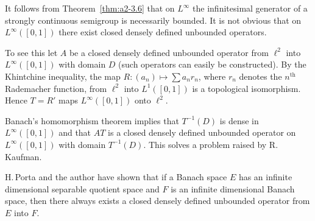 \begin{remark*}\label{rem:a2-final}
It follows from Theorem~\ref{thm:a2-3.6} that on $L^{\infty}$ the infinitesimal generator of a strongly continuous semigroup is necessarily bounded.
It is not obvious that on $L^{\infty}([0,1])$ there exist closed densely defined unbounded operators.

To see this let $A$ be a closed densely defined unbounded operator from $\ell^2$ into $L^{\infty}([0,1])$ with domain $D$ (such operators can easily be constructed).
By the Khintchine inequality, the map $R \colon (a_{n}) \mapsto \sum a_{n}r_{n}$, where $r_{n}$ denotes the $n^{\text{th}}$ Rademacher function, from $\ell^2$ into $L^1([0,1])$ is a topological isomorphism.
Hence $T = R'$ maps $L^{\infty}([0,1])$ onto $\ell^2$.

Banach's homomorphism theorem implies that $T^{-1}(D)$ is dense in $L^{\infty}([0,1])$ and that $AT$ is a closed densely defined unbounded operator on $L^{\infty}([0,1])$ with domain $T^{-1}(D)$.
This solves a problem raised by R.\, Kaufman.

H.\,Porta and the author have shown that if a Banach space $E$ has an infinite dimensional separable quotient space and $F$ is an infinite dimensional Banach space, then there always exists a closed densely defined unbounded operator from $E$ into $F$.
\end{remark*}
